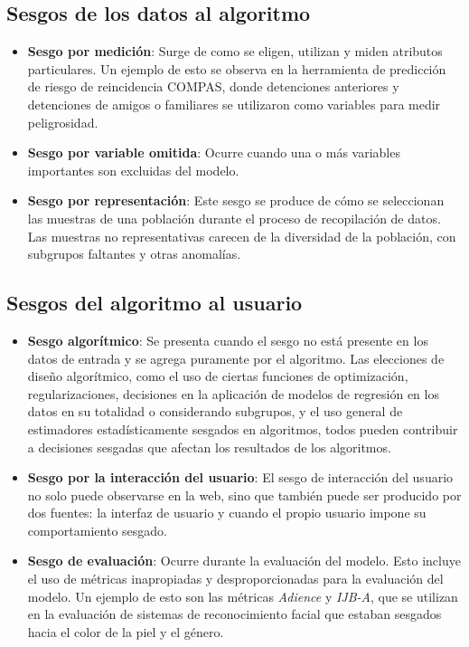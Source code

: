     \subsection{Sesgos de los datos al algoritmo}
    
    \begin{itemize}
        \item \textbf{Sesgo por medici\'on}: Surge de como se eligen, utilizan y miden atributos particulares. Un ejemplo de esto se observa 
        en la herramienta de predicci\'on de riesgo de reincidencia COMPAS, donde detenciones anteriores y detenciones de amigos o familiares se utilizaron 
        como variables para medir peligrosidad.
        
        \item \textbf{Sesgo por variable omitida}: Ocurre cuando una o m\'as variables importantes son excluidas del modelo.
        
        \item \textbf{Sesgo por representaci\'on}: Este sesgo se produce de c\'omo se seleccionan las muestras de una poblaci\'on durante el proceso de
        recopilaci\'on de datos. Las muestras no representativas carecen de la diversidad de la poblaci\'on, con subgrupos faltantes y otras anomal\'ias.
    \end{itemize}
    
    \subsection{Sesgos del algoritmo al usuario}

    \begin{itemize}
        \item \textbf{Sesgo algor\'itmico}: Se presenta cuando el sesgo no est\'a presente en los datos de entrada
        y se agrega puramente por el algoritmo. Las elecciones de dise\~no algor\'itmico, como el uso de ciertas funciones de optimizaci\'on, 
        regularizaciones, decisiones en la aplicaci\'on de modelos de regresi\'on en los datos en su totalidad o considerando subgrupos, y el uso
        general de estimadores estad\'isticamente sesgados en algoritmos, todos pueden contribuir a decisiones sesgadas que 
        afectan los resultados de los algoritmos. 
        
        \item \textbf{Sesgo por la interacci\'on del usuario}: El sesgo de interacci\'on del usuario no solo puede observarse en la web, sino que 
        tambi\'en puede ser producido por dos fuentes: la interfaz de usuario y cuando el propio usuario impone su comportamiento sesgado.
        
        \item \textbf{Sesgo de evaluaci\'on}: Ocurre durante la evaluaci\'on del modelo. Esto incluye el uso de m\'etricas
        inapropiadas y desproporcionadas para la evaluaci\'on del modelo. Un ejemplo de esto son las m\'etricas \emph{Adience} y \emph{IJB-A}, 
        que se utilizan en la evaluaci\'on de sistemas de reconocimiento facial que estaban sesgados hacia el color de la piel y el g\'enero.
    \end{itemize}
    
